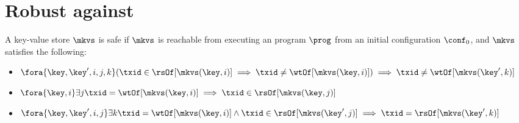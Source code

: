 \section{Robust against \WSI}
\begin{definition}
    \label{def:wsi-safe}
    A key-value store \( \mkvs \) is \WSI safe if \( \mkvs \) is 
    reachable from executing an program \( \prog \) from an initial configuration \( \conf_0 \),
    and \( \mkvs \) satisfies the following:
    \begin{itemize}
        \item \( \fora{\key, \key',i,j,k} ( \txid \in \rsOf[\mkvs(\key,i)] \implies \txid \neq \wtOf[\mkvs(\key,i)] ) \implies \txid \neq \wtOf[\mkvs(\key',k)] \)
        \item \( \fora{\key,i} \exists{j} \txid = \wtOf[\mkvs(\key,i)] \implies \txid \in \rsOf[\mkvs(\key,j)] \)
        \item \( \fora{\key,\key',i, j} \exists{k} \txid = \wtOf[\mkvs(\key,i)] \land \txid \in \rsOf[\mkvs(\key',j)] 
            \implies \txid = \rsOf[\mkvs(\key',k)] \)
    \end{itemize}
\end{definition}


